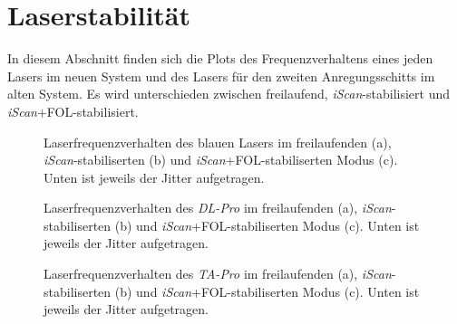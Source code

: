 \section{Laserstabilität}\label{anh:sec:laserstabilitaet}
In diesem Abschnitt finden sich die Plots des Frequenzverhaltens eines jeden
Lasers im neuen System und des Lasers für den zweiten Anregungsschitts im alten
System. Es wird unterschieden zwischen freilaufend, \textit{iScan}-stabilisiert
und \textit{iScan}+FOL-stabilisiert.
\begin{figure}[hp]
 	\centering
 	\footnotesize
 	\fbox{\parbox{\dimexpr \linewidth - 2\fboxrule - 2\fboxsep}{
 	\subfloat[]{
		\label{subfig:laserstabilitaet_a_freilaufend}
		
		}\\
 	\subfloat[]{
		\label{subfig:laserstabilitaet_a_iScan}
		
		}\\
	 \subfloat[]{
		\label{subfig:laserstabilitaet_a_iScan+FOL}
		
		}
	}}
	\caption[Laserfrequenzverhalten blauer Laser]{Laserfrequenzverhalten des blauen
	Lasers im freilaufenden (a), \textit{iScan}-stabiliserten (b) und
	\textit{iScan}+FOL-stabiliserten Modus (c). Unten ist jeweils der Jitter
	aufgetragen.}
	\label{fig:laserstabilitaet_a}
\end{figure}
\begin{figure}[hp]
 	\centering
 	\footnotesize
 	\fbox{\parbox{\dimexpr \linewidth - 2\fboxrule - 2\fboxsep}{
 	\subfloat[]{
		\label{subfig:laserstabilitaet_b_freilaufend}
		
		}\\
 	\subfloat[]{
		\label{subfig:laserstabilitaet_b_iScan}
		
		}\\
	 \subfloat[]{
		\label{subfig:laserstabilitaet_b_iScan+FOL}
		
		}
	}}
	\caption[Laserfrequenzverhalten \textit{DL-Pro}]{Laserfrequenzverhalten des
	\textit{DL-Pro} im freilaufenden (a), \textit{iScan}-stabiliserten (b) und
	\textit{iScan}+FOL-stabiliserten Modus (c). Unten ist jeweils der Jitter
	aufgetragen.}
	\label{fig:laserstabilitaet_b}
\end{figure}
\begin{figure}[hp]
 	\centering
 	\footnotesize
 	\fbox{\parbox{\dimexpr \linewidth - 2\fboxrule - 2\fboxsep}{
 	\subfloat[]{
		\label{subfig:laserstabilitaet_c_freilaufend}
		
		}\\
 	\subfloat[]{
		\label{subfig:laserstabilitaet_c_iScan}
		
		}\\
	 \subfloat[]{
		\label{subfig:laserstabilitaet_c_iScan+FOL}
		
		}
	}}
	\caption[Laserfrequenzverhalten \textit{TA-Pro}]{Laserfrequenzverhalten des
	\textit{TA-Pro} im freilaufenden (a), \textit{iScan}-stabiliserten (b) und
	\textit{iScan}+FOL-stabiliserten Modus (c). Unten ist jeweils der Jitter
	aufgetragen.}
	\label{fig:laserstabilitaet_c}
\end{figure}
